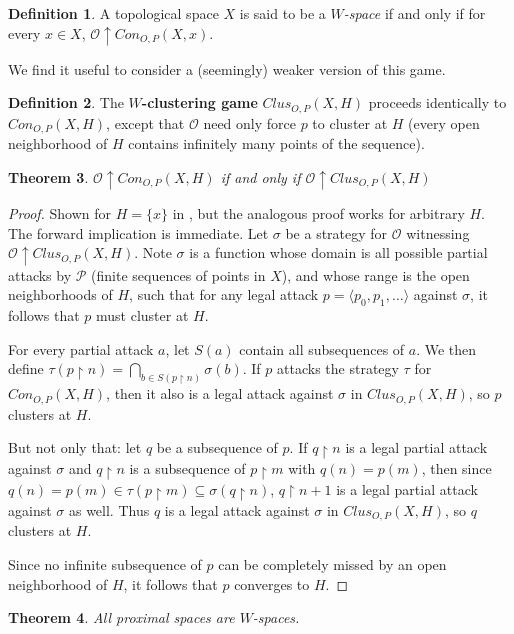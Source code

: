 \documentclass{amsart}
\newtheorem{thm}{Theorem}[section]
\theoremstyle{definition}
\newtheorem{defn}[thm]{Definition}
\theoremstyle{remark}
\newcommand{\<}{\langle}
\renewcommand{\>}{\rangle}
\newcommand{\congame}[2]{Con_{O,P}(#1,#2)}
\newcommand{\clusgame}[2]{Clus_{O,P}(#1,#2)}
\newcommand{\pl}[1]{\mathscr{#1}}
\newcommand{\win}{\uparrow}
\newcommand{\rest}{\restriction}
\newcommand{\term}{\textit}
\begin{document}
\begin{defn}
  A topological space $X$ is said to be a \term{$W$-space} if and only if for every $x\in X$, $\pl O\win \congame{X}{x}$.
\end{defn}

We find it useful to consider a (seemingly) weaker version of this game.

\begin{defn}
  The \textbf{$W$-clustering game} $\clusgame{X}{H}$ proceeds identically to $\congame{X}{H}$, except that $\pl O$ need only force $p$ to cluster at $H$ (every open neighborhood of $H$ contains infinitely many points of the sequence).
\end{defn}

\begin{thm}
  $\pl O\win\congame{X}{H}$ if and only if $\pl O \win\clusgame{X}{H}$
\end{thm}

\begin{proof}
  Shown for $H=\{x\}$ in \cite{ginfinite}, but the analogous proof works for arbitrary $H$. The forward implication is immediate. Let $\sigma$ be a strategy for $\pl O$ witnessing $\pl O\win \clusgame{X}{H}$. Note $\sigma$ is a function whose domain is all possible partial attacks by $\pl P$ (finite sequences of points in $X$), and whose range is the open neighborhoods of $H$, such that for any legal attack $p=\<p_0,p_1,\dots\>$ against $\sigma$, it follows that $p$ must cluster at $H$.

  For every partial attack $a$, let $S(a)$ contain all subsequences of $a$. We then define $\tau(p\rest n)=\bigcap_{b\in S(p\rest n)}\sigma(b)$. If $p$ attacks the strategy $\tau$ for $\congame{X}{H}$, then it also is a legal attack against $\sigma$ in $\clusgame{X}{H}$, so $p$ clusters at $H$.

  But not only that: let $q$ be a subsequence of $p$. If $q\rest n$ is a legal partial attack against $\sigma$ and $q\rest n$ is a subsequence of $p\rest m$ with $q(n)=p(m)$, then since $q(n)=p(m)\in\tau(p\rest m)\subseteq\sigma(q\rest n)$, $q\rest n+1$ is a legal partial attack against $\sigma$ as well. Thus $q$ is a legal attack against $\sigma$ in $\clusgame{X}{H}$, so $q$ clusters at $H$.

  Since no infinite subsequence of $p$ can be completely missed by an open neighborhood of $H$, it follows that $p$ converges to $H$.
\end{proof}

\begin{thm}\cite{b}
  All proximal spaces are $W$-spaces.
\end{thm}
\end{document}
